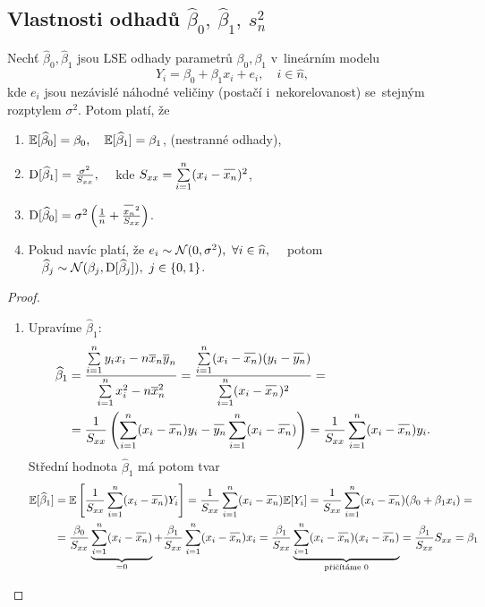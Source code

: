 \subsection{Vlastnosti odhadů $\widehat{\beta}_0,~ \widehat{\beta}_1, ~ s_n^2$}
\begin{theorem}
   Nechť $\widehat{\beta}_0, \widehat{\beta}_1$ jsou $\mathrm{LSE}$ odhady parametrů $\beta_0, \beta_1$ v~lineárním modelu
 $$
   		Y_i = \beta_0 + \beta_1 x_i + e_i, \quad i\in\widehat{n},
 $$
   kde $e_i$ jsou nezávislé náhodné veličiny (postačí i~nekorelovanost) se~stejným rozptylem $\sigma^2$. Potom platí, že
   \begin{enumerate}
  \item $\mathbb{E} [\widehat{\beta}_0] = \beta_0, \quad \mathbb{E} [\widehat{\beta}_1] = \beta_1$, (nestranné odhady),
  \item $\mathrm{D} [\widehat{\beta}_1] = \frac{\sigma^2}{S_{xx}} , \quad$ kde $ \Sxx = \sumin (x_i - \oxnn)^2$,
  \item $\D [\widehat{\beta}_0] = \sigma^2 \left(\frac{1}{n} + \frac{\oxnn^2}{\Sxx} \right)$.
  \item Pokud navíc platí, že $e_i \sim \mathcal{N} (0, \sigma^2), ~ \forall i\in\widehat{n}, \quad$ potom $\quad \widehat{\beta}_j \sim \mathcal{N} (\beta_j, \mathrm{D} [\widehat{\beta}_j]), ~ j \in \{0, 1\}$.
\end{enumerate}
\begin{proof}
   \begin{enumerate}
  \item Upravíme $\widehat{\beta}_1$:
  		\begin{align}
  		    \widehat{\beta}_1 & = \frac{\sumin y_i x_i - n \overline{x}_n \overline{y}_n}{\sumin x_i^2 - n \overline{x}_n^2} = \frac{\sumin (x_i - \oxnn)(y_i - \oynn)}{\sumin (x_i - \oxnn)^2} = \notag \\
  		    & = \frac{1}{\Sxx} \left(\sumin (x_i - \oxnn) y_i - \oynn \sumin (x_i - \oxnn)  \right) = \frac{1}{\Sxx} \sumin (x_i - \oxnn) y_i. \label{Vzorec: beta1}
  		    \end{align}
  		Střední hodnota $\widehat{\beta}_1$ má potom tvar
  		\begin{equation*}
  		\begin{aligned}
  		    \E [\widehat{\beta}_1] & = \E \left[\frac{1}{\Sxx} \sumin (x_i - \oxnn) Y_i \right] = \frac{1}{\Sxx} \sumin (x_i - \oxnn) \E [Y_i]
  		 = \frac{1}{\Sxx} \sumin (x_i - \oxnn) (\beta_0 + \beta_1 x_i) = \\ & = \frac{\beta_0}{\Sxx} \underbrace{\sumin (x_i - \oxnn)}_{ = 0} + \frac{\beta_1}{\Sxx} \sumin (x_i - \oxnn) x_i = \frac{\beta_1}{\Sxx} \underbrace{\sumin (x_i - \oxnn)(x_i - \oxnn)}_{\text{přičítáme 0}} = \frac{\beta_1}{\Sxx} \Sxx = \beta_1

\end{aligned}
\end{equation*}
\end{enumerate}
\end{proof}
\end{theorem}
